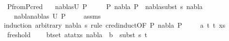\begin{isabellebody}
\endisatagproof
{\isafoldproof}%
%
\isadelimproof
\isanewline
%
\endisadelimproof
\isanewline
{}\isamarkupfalse%
\ P{}{\isacharunderscore}{\kern0pt}from{\isacharunderscore}{\kern0pt}P{}{\isacharunderscore}{\kern0pt}cred{\isacharcolon}{\kern0pt}\isanewline
\ \ \ {\isachardoublequoteopen}{\isacharparenleft}{\kern0pt}nabla{}{\isacharcomma}{\kern0pt}s{}{\isacharparenright}{\kern0pt}{\isasymin}U\ P{}{\isachardoublequoteclose}\isanewline
\ \ \ \ \ {\isachardoublequoteopen}P{}\ {\isasymturnstile}nabla{}{\isasymrightarrow}\ P{}{\isachardoublequoteclose}\ \ {\isachardoublequoteopen}nabla{}{\isasymTurnstile}{\isacharparenleft}{\kern0pt}subst\ s{}{\isacharparenright}{\kern0pt}\ nabla{}{\isachardoublequoteclose}\isanewline
\ \ \ {\isachardoublequoteopen}{\isacharparenleft}{\kern0pt}nabla{}{\isasymunion}nabla{}{\isacharcomma}{\kern0pt}s{}{\isacharparenright}{\kern0pt}{\isasymin}\ U\ P{}{\isachardoublequoteclose}\ \isanewline
%
\isadelimproof
\ \ %
\endisadelimproof
%
\isatagproof
{}\isamarkupfalse%
\ assms\isanewline
{}\isamarkupfalse%
{\isacharparenleft}{\kern0pt}induction\ arbitrary{\isacharcolon}{\kern0pt}\ nabla{}\ s{}\ rule{\isacharcolon}{\kern0pt}\ c{\isacharunderscore}{\kern0pt}red{\isachardot}{\kern0pt}induct{\isacharbrackleft}{\kern0pt}OF\ {\isacartoucheopen}P{}\ {\isasymturnstile}nabla{}{\isasymrightarrow}\ P{}{\isacartoucheclose}{\isacharbrackright}{\kern0pt}{\isacharparenright}{\kern0pt}\isanewline
\ \ \isamarkupfalse%
\ {\isacharparenleft}{\kern0pt}{}\ a\ t{}\ t{}\ xs{\isacharparenright}{\kern0pt}\isanewline
\ \ \isamarkupfalse%
\ fresh{\isacharunderscore}{\kern0pt}old{\isacharcolon}{\kern0pt}\isanewline
\ \ \ \ {\isachardoublequoteopen}{\isasymforall}{\isacharparenleft}{\kern0pt}b{\isacharcomma}{\kern0pt}t{\isacharparenright}{\kern0pt}{\isasymin}set\ {\isacharparenleft}{\kern0pt}{\isacharparenleft}{\kern0pt}a{\isacharcomma}{\kern0pt}t{}{\isacharparenright}{\kern0pt}{\isacharhash}{\kern0pt}{\isacharparenleft}{\kern0pt}a{\isacharcomma}{\kern0pt}t{}{\isacharparenright}{\kern0pt}{\isacharhash}{\kern0pt}xs{\isacharparenright}{\kern0pt}{\isachardot}{\kern0pt}\ nabla{}\ {\isasymturnstile}\ b\ {\isasymsharp}\ subst\ s{}\ t{\isachardoublequoteclose}\isanewline

\end{isabellebody}

